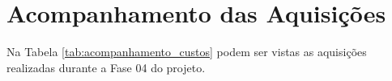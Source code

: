 
\newpage
\section{Acompanhamento das Aquisições}

Na Tabela \ref{tab:acompanhamento_custos} podem ser vistas as aquisições realizadas durante a Fase 04 do projeto.


